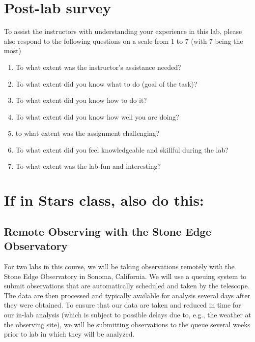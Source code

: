 
\section{Post-lab survey}

To assist the instructors with understanding your experience in this lab, please also respond to the following questions on a scale from 1 to 7 (with 7 being the most)
\begin{enumerate}
	\item To what extent was the instructor's assistance needed?
	\item To what extent did you know what to do (goal of the task)?
	\item To what extent did you know how to do it?
	\item To what extent did you know how well you are doing?
	\item to what extent was the assignment challenging?
	\item To what extent did you feel knowledgeable and skillful during the lab?
	\item To what extent was the lab fun and interesting?
\end{enumerate}

\section{If in Stars class, also do this:}
\subsection{Remote Observing with the Stone Edge Observatory}

For two labs in this course, we will be taking observations remotely with the Stone Edge Observatory in Sonoma, California. We will use a queuing system to submit observations that are automatically scheduled and taken by the telescope. The data are then processed and typically available for analysis several days after they were obtained. To ensure that our data are taken and reduced in time for our in-lab analysis (which is subject to possible delays due to, e.g., the weather at the observing site), we will be submitting observations to the queue several weeks prior to lab in which they will be analyzed.

